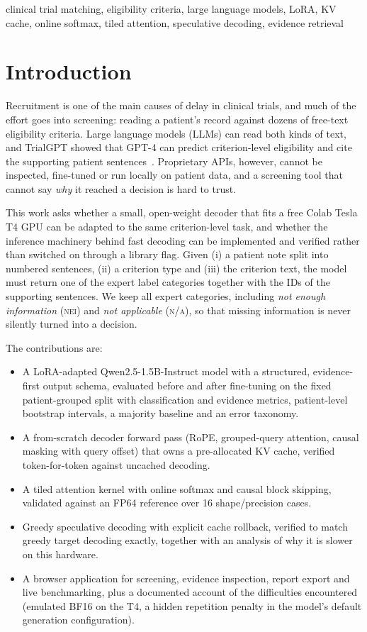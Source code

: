 \documentclass[conference]{IEEEtran}
\newcommand{\NEI}{\textsc{nei}}
\newcommand{\NA}{\textsc{n/a}}
\begin{document}
\begin{IEEEkeywords}
clinical trial matching, eligibility criteria, large language models, LoRA, KV cache, online softmax, tiled attention, speculative decoding, evidence retrieval
\end{IEEEkeywords}

\section{Introduction}
Recruitment is one of the main causes of delay in clinical trials, and much of the effort goes into screening: reading a patient's record against dozens of free-text eligibility criteria. Large language models (LLMs) can read both kinds of text, and TrialGPT showed that GPT-4 can predict criterion-level eligibility and cite the supporting patient sentences~\cite{jin2024trialgpt}. Proprietary APIs, however, cannot be inspected, fine-tuned or run locally on patient data, and a screening tool that cannot say \emph{why} it reached a decision is hard to trust.

This work asks whether a small, open-weight decoder that fits a free Colab Tesla T4 GPU can be adapted to the same criterion-level task, and whether the inference machinery behind fast decoding can be implemented and verified rather than switched on through a library flag. Given (i) a patient note split into numbered sentences, (ii) a criterion type and (iii) the criterion text, the model must return one of the expert label categories together with the IDs of the supporting sentences. We keep all expert categories, including \emph{not enough information} (\NEI) and \emph{not applicable} (\NA), so that missing information is never silently turned into a decision.

The contributions are:
\begin{itemize}
\item A LoRA-adapted Qwen2.5-1.5B-Instruct model with a structured, evidence-first output schema, evaluated before and after fine-tuning on the fixed patient-grouped split with classification and evidence metrics, patient-level bootstrap intervals, a majority baseline and an error taxonomy.
\item A from-scratch decoder forward pass (RoPE, grouped-query attention, causal masking with query offset) that owns a pre-allocated KV cache, verified token-for-token against uncached decoding.
\item A tiled attention kernel with online softmax and causal block skipping, validated against an FP64 reference over 16 shape/precision cases.
\item Greedy speculative decoding with explicit cache rollback, verified to match greedy target decoding exactly, together with an analysis of why it is slower on this hardware.
\item A browser application for screening, evidence inspection, report export and live benchmarking, plus a documented account of the difficulties encountered (emulated BF16 on the T4, a hidden repetition penalty in the model's default generation configuration).
\end{itemize}
\end{document}
